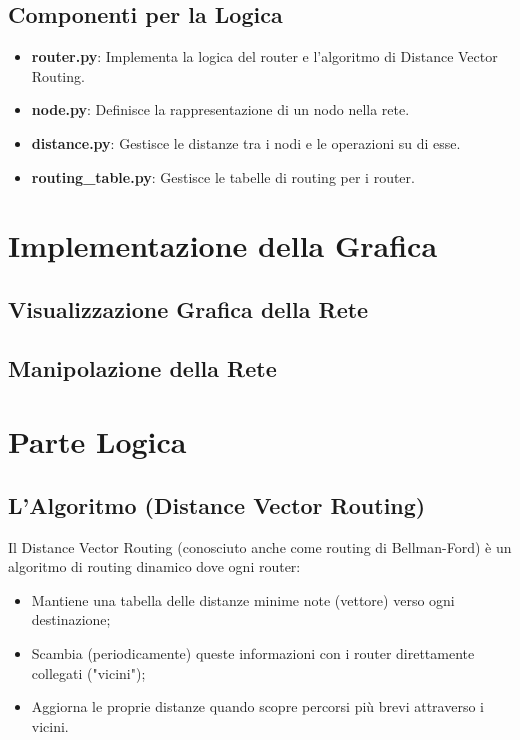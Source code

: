 \documentclass[a4paper,12pt]{report}
\begin{document}
\subsection{Componenti per la Logica}
\begin{itemize}
    \item \textbf{router.py}: Implementa la logica del router e l'algoritmo di Distance Vector Routing.
    \item \textbf{node.py}: Definisce la rappresentazione di un nodo nella rete.
    \item \textbf{distance.py}: Gestisce le distanze tra i nodi e le operazioni su di esse.
    \item \textbf{routing\_table.py}: Gestisce le tabelle di routing per i router.
\end{itemize}

\newpage
\section{Implementazione della Grafica}
\subsection{Visualizzazione Grafica della Rete}
\subsection{Manipolazione della Rete}

\newpage
\section{Parte Logica}
\subsection{L'Algoritmo (Distance Vector Routing)}
Il Distance Vector Routing (conosciuto anche come routing di Bellman-Ford) è un algoritmo di routing dinamico dove ogni router:
\begin{itemize}
    \item Mantiene una tabella delle distanze minime note (vettore) verso ogni destinazione;
    \item Scambia (periodicamente) queste informazioni con i router direttamente collegati ("vicini");
    \item Aggiorna le proprie distanze quando scopre percorsi più brevi attraverso i vicini.
\end{itemize}
\end{document}
